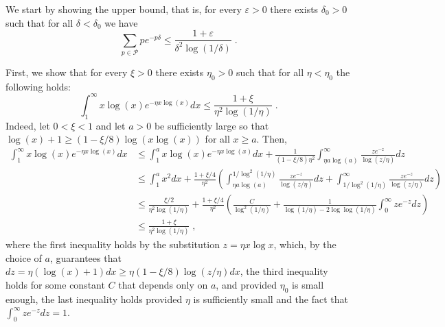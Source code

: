 \documentclass[11pt]{article}
\makeatletter
\theoremstyle{plain}
\renewenvironment{proof}[1][\proofname]
{\par\pushQED{\qed}
	\normalfont\topsep6\p@\@plus6\p@\relax\trivlist
	\item[\hskip\labelsep\bfseries#1\@addpunct{.}]
	\ignorespaces}
{\popQED\endtrivlist\@endpefalse}
\makeatother
\begin{document}
\begin{proof}[Proof of Lemma \ref{lem:prime_sum}]
We start by showing the upper bound, that is, for every $\varepsilon>0$ there exists $\delta_0>0$ such that for all $\delta<\delta_0$ we have
\[
    \sum_{p\in\mathcal{P}}pe^{-p\delta}\leq \frac{1+\varepsilon}{\delta^2\log(1/\delta)}\;.
\]

First, we show that for every $\xi>0$ there exists $\eta_0>0$ such that for all $\eta<\eta_0$ the following holds:
\begin{equation}\label{eq:evaluating_the_integral_primes_upper}
        \int_{1}^{\infty}x\log(x)e^{-\eta x\log(x)}dx\leq \frac{1+\xi}{\eta^2\log(1/\eta)}\;.
\end{equation}
Indeed, let $0<\xi<1$ and let $a>0$ be sufficiently large so that $\log(x)+1\geq (1-\xi/8)\log(x\log(x))$ for all $x\geq a$. Then,
\begin{align*}\label{eq:evaluation_with_integral}
    \int_{1}^{\infty}x\log(x)e^{-\eta x\log(x)}dx &\leq \int_{1}^{a}x\log(x)e^{-\eta x\log(x)}dx+\frac{1}{(1-\xi/8)\eta^2}\int_{\eta a\log(a)}^{\infty}\frac{z e^{-z}}{\log(z/\eta)}dz\nonumber\\
    &\leq \int_{1}^{a}x^2dx+\frac{1+\xi/4}{\eta^2}\left(\int_{\eta a\log(a)}^{1/\log^2(1/\eta)}\frac{ze^{-z}}{\log(z/\eta)}dz+\int_{1/\log^2(1/\eta)}^{\infty}\frac{ze^{-z}}{\log(z/\eta)}dz\right)\nonumber\\
    &\leq \frac{\xi/2}{\eta^2\log(1/\eta)}+\frac{1+\xi/4}{\eta^2}\left(\frac{C}{\log^2(1/\eta)}+\frac{1}{\log(1/\eta)-2\log\log(1/\eta)}\int_{0}^{\infty}ze^{-z}dz\right)\\
    &\leq \frac{1+\xi}{\eta^2\log(1/\eta)}\;,
\end{align*}
where the first inequality holds by the substitution $z=\eta x \log x$, which, by the choice of $a$, guarantees that
$dz=\eta(\log(x)+1)dx\geq \eta(1-\xi/8)\log(z/\eta)dx$, the third inequality holds for some constant $C$ that depends only on $a$, and provided $\eta_0$ is small enough, the last inequality holds provided $\eta$ is sufficiently small and the fact that $\int_{0}^{\infty}ze^{-z}dz=1$.


\end{proof}
\end{document}
